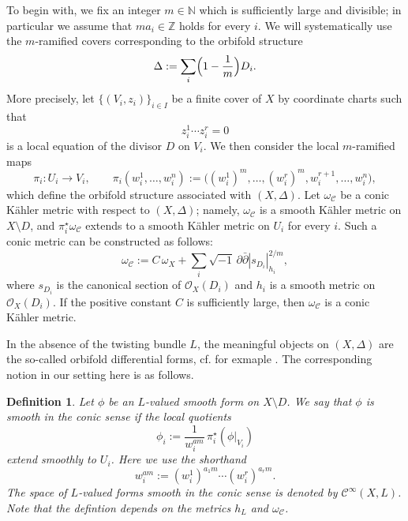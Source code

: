 \documentclass[english]{amsart}
\newcommand{\ddbar}{\partial\bar{\partial}}
\newcommand{\cC}{\mathcal{C}}
\renewcommand{\O}{\mathcal{O}}
\newtheorem{defn}[thm]{Definition}
\numberwithin{equation}{thm}
\begin{document}
To begin with, we fix an integer $m\in \mathbb N$ which is sufficiently large and divisible; in particular we assume that $m a_i\in \mathbb Z$ holds for every $i$.
We will systematically use the $m$-ramified covers corresponding to the orbifold structure
\[
\Delta := \sum_i \Bigl(1-\frac{1}{m}\Bigr)D_i.
\]
More precisely, let $\{(V_i,z_i)\}_{i\in I}$ be a finite cover of $X$ by coordinate charts such that
\begin{equation}\label{deck2}
	z_i^1\cdots z_i^r=0
\end{equation}
is a local equation of the divisor $D$ on $V_i$.
We then consider the local $m$-ramified maps
\begin{equation}\label{deck3}
	\pi_i:U_i\to V_i,\qquad
	\pi_i(w_i^1,\dots,w_i^n):=
	\bigl((w_i^1)^m,\dots,(w_i^r)^m,w_i^{r+1},\dots,w_i^n\bigr),
\end{equation}
which define the orbifold structure associated with $(X,\Delta)$.
Let $\omega_{\cC}$ be a conic K\"ahler metric with respect to $(X,\Delta)$; namely, $\omega_{\cC}$ is a smooth K\"ahler metric on $X\setminus D$, and $\pi_i^\star \omega_{\cC}$ extends to a smooth K\"ahler metric on $U_i$ for every $i$.
Such a conic metric can be constructed as follows:
\begin{equation}\label{conicmetric}
	\omega_{\cC}:= C\,\omega_X+\sum_i \sqrt{-1}\,\ddbar |s_{D_i}|_{h_i}^{2/m},
\end{equation}
where $s_{D_i}$ is the canonical section of $\O_X(D_i)$ and $h_i$ is a smooth metric on $\O_X(D_i)$.
If the positive constant $C$ is sufficiently large, then $\omega_{\cC}$ is a conic K\"ahler metric.

\medskip

\noindent In the absence of the twisting bundle $L$, the meaningful objects on $(X,\Delta)$ are the so-called orbifold differential forms, cf. for exmaple \cite{Rai96}.
The corresponding notion in our setting here is as follows.

\begin{defn}\label{forms}
	Let $\phi$ be an $L$-valued smooth form on $X\setminus D$. We say that $\phi$ is \emph{smooth in the conic sense} if the local quotients
	\begin{equation}\label{deck4}
		\phi_i := \frac{1}{w_i^{am}}\,\pi_i^\star(\phi|_{V_i})
	\end{equation}
	extend smoothly to $U_i$.
	Here we use the shorthand
	\[
	w_i^{am}:=(w_i^1)^{a_1 m}\cdots (w_i^r)^{a_r m}.
	\]
	The space of $L$-valued forms smooth in the conic sense is denoted by $\cC^\infty(X,L)$. Note that the defintion  depends on the metrics $h_L$ and $\omega_\cC$.
\end{defn}
\end{document}

